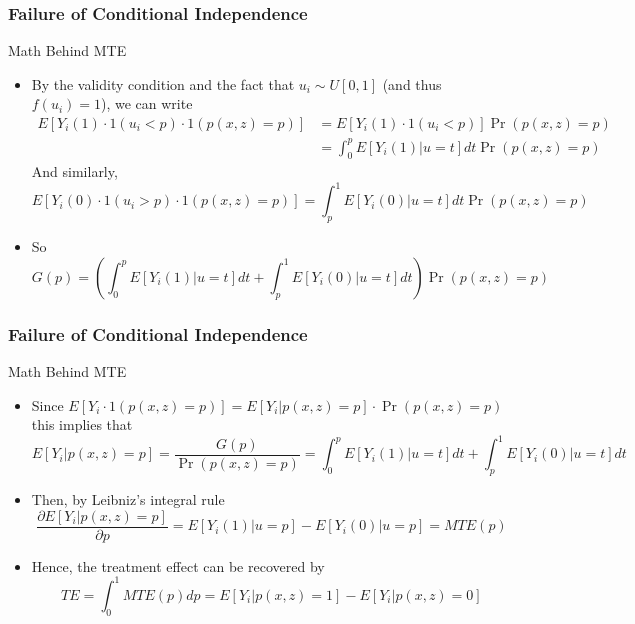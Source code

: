 \documentclass{beamer}
\begin{document}
\begin{frame}
\frametitle{Failure of Conditional Independence}
Math Behind MTE
\begin{itemize}
\item By the validity condition and the fact that $u_i\sim U[0,1]$ (and thus $f(u_i)=1$), we can write
\footnotesize{\begin{align*}
E[Y_i(1)\cdot 1(u_i<p)\cdot 1(p(x,z)=p)]&=E[Y_i(1)\cdot 1(u_i<p)]\Pr(p(x,z)=p)\\
&=\int_0^pE[Y_i(1)|u=t]dt\Pr(p(x,z)=p)
\end{align*}}\normalsize
And similarly, 
\footnotesize{\[
E[Y_i(0)\cdot 1(u_i>p)\cdot 1(p(x,z)=p)]=\int_p^1E[Y_i(0)|u=t]dt\Pr(p(x,z)=p)
\]}\normalsize
\item So 
\footnotesize{\[
G(p)=\left(\int_0^pE[Y_i(1)|u=t]dt+\int_p^1E[Y_i(0)|u=t]dt\right)\Pr(p(x,z)=p)
\]}\normalsize
\end{itemize}
\end{frame}

\begin{frame}
\frametitle{Failure of Conditional Independence}
Math Behind MTE
\begin{itemize}
\item Since $E[Y_i\cdot 1(p(x,z)=p)]=E[Y_i|p(x,z)=p]\cdot \Pr(p(x,z)=p) $ this implies that
\footnotesize{\[
E[Y_i|p(x,z)=p]=\frac{G(p)}{\Pr(p(x,z)=p)}=\int_0^pE[Y_i(1)|u=t]dt+\int_p^1E[Y_i(0)|u=t]dt
\]}\normalsize
\item Then, by Leibniz's integral rule
\[
\frac{\partial E[Y_i | p(x,z)=p]}{\partial p}=E[Y_i(1)|u=p]-E[Y_i(0)|u=p]=MTE(p)
\]
\item Hence, the treatment effect can be recovered by
\[
TE=\int_0^1MTE(p)dp=E[Y_i|p(x,z)=1]-E[Y_i|p(x,z)=0]
\]
\end{itemize}
\end{frame}
\end{document}
